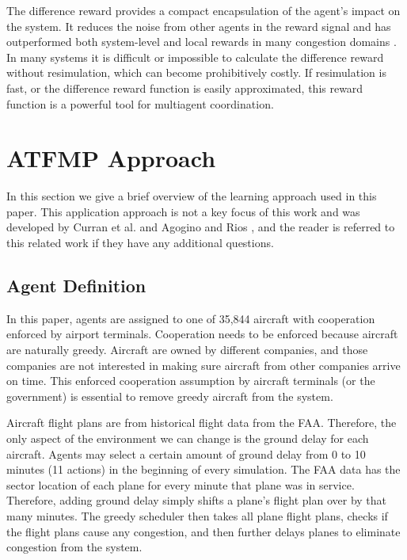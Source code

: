 \documentclass[letterpaper]{article}
\begin{document}
The difference reward provides a compact encapsulation of the agent's impact on the system. It reduces the noise from other agents in the reward signal and has outperformed both system-level and local rewards in many congestion domains \cite{AAMAS12-agmon,Agogino:2012:ELS:2330163.2330306,Colby:2012:SFF:2343576.2343637,tumer-wolpert_jair02}. In many systems it is difficult or impossible to calculate the difference reward without resimulation, which can become prohibitively costly. If resimulation is fast, or the difference reward function is easily approximated, this reward function is a powerful tool for multiagent coordination.

\section{ATFMP Approach}

In this section we give a brief overview of the learning approach used in this paper. This application approach is not a key focus of this work and was developed by Curran et al. \cite{Curran:2013:AHC:2484920.2485183} and Agogino and Rios \cite{Agogino:2009:EEM:1570256.1570258,Rios}, and the reader is referred to this related work if they have any additional questions.

\subsection{Agent Definition}
In this paper, agents are assigned to one of 35,844 aircraft with cooperation enforced by airport terminals. Cooperation needs to be enforced because aircraft are naturally greedy. Aircraft are owned by different companies, and those companies are not interested in making sure aircraft from other companies arrive on time. This enforced cooperation assumption by aircraft terminals (or the government) is essential to remove greedy aircraft from the system.

Aircraft flight plans are from historical flight data from the FAA. Therefore, the only aspect of the environment we can change is the ground delay for each aircraft. Agents may select a certain amount of ground delay from 0 to 10 minutes (11 actions) in the beginning of every simulation. The FAA data has the sector location of each plane for every minute that plane was in service. Therefore, adding ground delay simply shifts a plane's flight plan over by that many minutes. The greedy scheduler then takes all plane flight plans, checks if the flight plans cause any congestion, and then further delays planes to eliminate congestion from the system.
\end{document}
